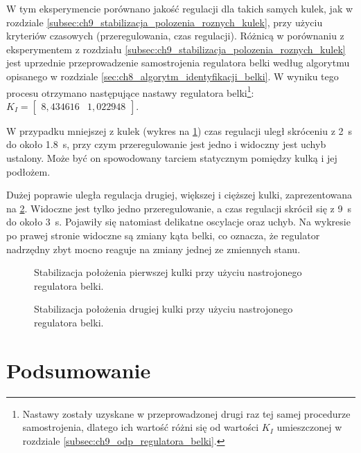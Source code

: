 W tym eksperymencie porównano jakość regulacji dla takich samych kulek, jak w rozdziale \ref{subsec:ch9_stabilizacja_polozenia_roznych_kulek}, przy użyciu kryteriów czasowych (przeregulowania, czas regulacji). Różnicą w porównaniu z eksperymentem z rozdziału \ref{subsec:ch9_stabilizacja_polozenia_roznych_kulek} jest uprzednie przeprowadzenie samostrojenia regulatora belki według algorytmu opisanego w rozdziale \ref{sec:ch8_algorytm_identyfikacji_belki}. W wyniku tego procesu otrzymano następujące nastawy regulatora belki\footnote{Nastawy zostały uzyskane w przeprowadzonej drugi raz tej samej procedurze samostrojenia, dlatego ich wartość różni się od wartości $K_I$ umieszczonej w rozdziale \ref{subsec:ch9_odp_regulatora_belki}.}: $K_I = \begin{bmatrix}
8,434616 & 1,022948
\end{bmatrix}$.

W przypadku mniejszej z kulek (wykres na \cref{fig:stabilizacja_kulka1_nastrojona}) czas regulacji uległ skróceniu z \SI{2}{\second} do około \SI{1.8}{\second}, przy czym przeregulowanie jest jedno i widoczny jest uchyb ustalony. Może być on spowodowany tarciem statycznym pomiędzy kulką i jej podłożem.

Dużej poprawie uległa regulacja drugiej, większej i cięższej kulki, zaprezentowana na \cref{fig:stabilizacja_kulka2_nastrojona}. Widoczne jest tylko jedno przeregulowanie, a czas regulacji skrócił się z \SI{9}{\second} do około \SI{3}{\second}. Pojawiły się natomiast delikatne oscylacje oraz uchyb. Na wykresie po prawej stronie widoczne są zmiany kąta belki, co oznacza, że regulator nadrzędny zbyt mocno reaguje na zmiany jednej ze zmiennych stanu.

\begin{figure}[p]
    
    \caption{Stabilizacja położenia pierwszej kulki przy użyciu nastrojonego regulatora belki.}
    \label{fig:stabilizacja_kulka1_nastrojona}
\end{figure}
\begin{figure}[p]
    
    \caption{Stabilizacja położenia drugiej kulki przy użyciu nastrojonego regulatora belki.}
    \label{fig:stabilizacja_kulka2_nastrojona}
\end{figure}

\section{Podsumowanie}

